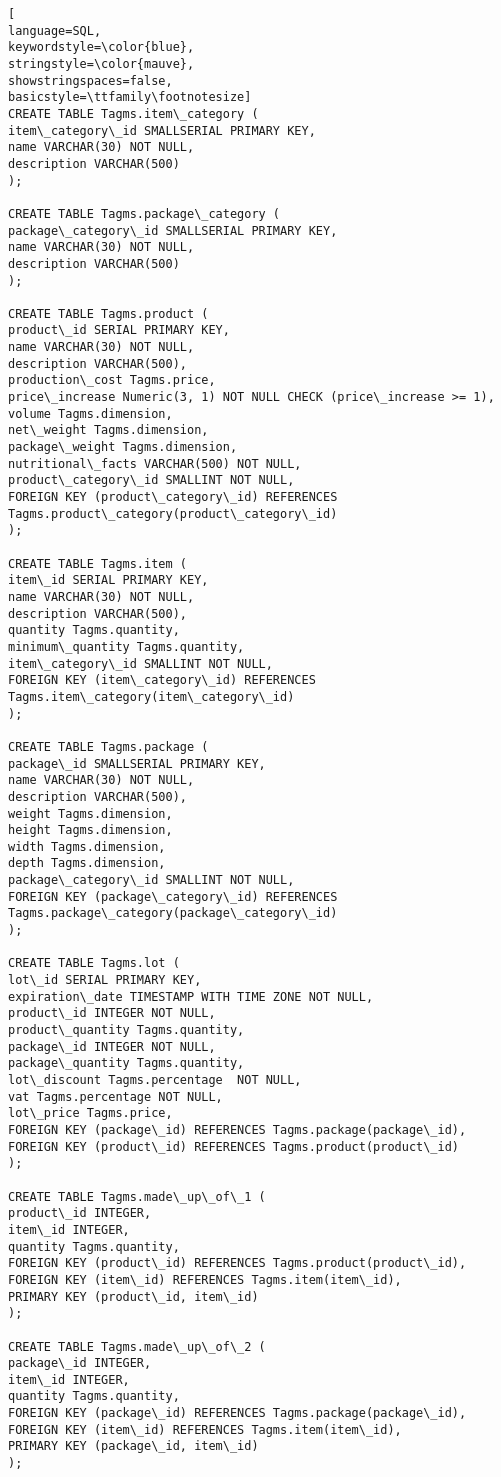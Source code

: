 \begin{lstlisting}[
language=SQL,
keywordstyle=\color{blue},
stringstyle=\color{mauve},
showstringspaces=false,
basicstyle=\ttfamily\footnotesize]
CREATE TABLE Tagms.item\_category (
item\_category\_id SMALLSERIAL PRIMARY KEY,
name VARCHAR(30) NOT NULL,
description VARCHAR(500)
);

CREATE TABLE Tagms.package\_category (
package\_category\_id SMALLSERIAL PRIMARY KEY,
name VARCHAR(30) NOT NULL,
description VARCHAR(500)
);

CREATE TABLE Tagms.product (
product\_id SERIAL PRIMARY KEY,
name VARCHAR(30) NOT NULL,
description VARCHAR(500),
production\_cost Tagms.price,
price\_increase Numeric(3, 1) NOT NULL CHECK (price\_increase >= 1),
volume Tagms.dimension,
net\_weight Tagms.dimension,
package\_weight Tagms.dimension,
nutritional\_facts VARCHAR(500) NOT NULL,
product\_category\_id SMALLINT NOT NULL,
FOREIGN KEY (product\_category\_id) REFERENCES Tagms.product\_category(product\_category\_id)
);

CREATE TABLE Tagms.item (
item\_id SERIAL PRIMARY KEY,
name VARCHAR(30) NOT NULL,
description VARCHAR(500),
quantity Tagms.quantity,
minimum\_quantity Tagms.quantity,
item\_category\_id SMALLINT NOT NULL,
FOREIGN KEY (item\_category\_id) REFERENCES Tagms.item\_category(item\_category\_id)
);

CREATE TABLE Tagms.package (
package\_id SMALLSERIAL PRIMARY KEY,
name VARCHAR(30) NOT NULL,
description VARCHAR(500),
weight Tagms.dimension,
height Tagms.dimension,
width Tagms.dimension,
depth Tagms.dimension,
package\_category\_id SMALLINT NOT NULL,
FOREIGN KEY (package\_category\_id) REFERENCES Tagms.package\_category(package\_category\_id)
);

CREATE TABLE Tagms.lot (
lot\_id SERIAL PRIMARY KEY,
expiration\_date TIMESTAMP WITH TIME ZONE NOT NULL,
product\_id INTEGER NOT NULL,
product\_quantity Tagms.quantity,
package\_id INTEGER NOT NULL,
package\_quantity Tagms.quantity,
lot\_discount Tagms.percentage  NOT NULL,
vat Tagms.percentage NOT NULL,
lot\_price Tagms.price,
FOREIGN KEY (package\_id) REFERENCES Tagms.package(package\_id),
FOREIGN KEY (product\_id) REFERENCES Tagms.product(product\_id)
);

CREATE TABLE Tagms.made\_up\_of\_1 (
product\_id INTEGER,
item\_id INTEGER,
quantity Tagms.quantity,
FOREIGN KEY (product\_id) REFERENCES Tagms.product(product\_id),
FOREIGN KEY (item\_id) REFERENCES Tagms.item(item\_id),
PRIMARY KEY (product\_id, item\_id)
);

CREATE TABLE Tagms.made\_up\_of\_2 (
package\_id INTEGER,
item\_id INTEGER,
quantity Tagms.quantity,
FOREIGN KEY (package\_id) REFERENCES Tagms.package(package\_id),
FOREIGN KEY (item\_id) REFERENCES Tagms.item(item\_id),
PRIMARY KEY (package\_id, item\_id)
);


\end{lstlisting}
